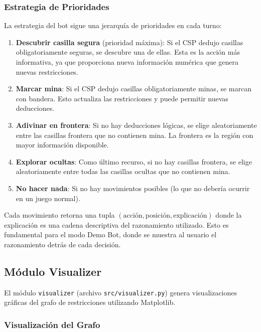 \documentclass[12pt,a4paper]{article}
\begin{document}
\subsubsection{Estrategia de Prioridades}

La estrategia del bot sigue una jerarquía de prioridades en cada turno:

\begin{enumerate}[itemsep=2pt]
    \item \textbf{Descubrir casilla segura} (prioridad máxima): Si el CSP dedujo casillas obligatoriamente seguras, se descubre una de ellas. Esta es la acción más informativa, ya que proporciona nueva información numérica que genera nuevas restricciones.

    \item \textbf{Marcar mina}: Si el CSP dedujo casillas obligatoriamente minas, se marcan con bandera. Esto actualiza las restricciones y puede permitir nuevas deducciones.

    \item \textbf{Adivinar en frontera}: Si no hay deducciones lógicas, se elige aleatoriamente entre las casillas frontera que no contienen mina. La frontera es la región con mayor información disponible.

    \item \textbf{Explorar ocultas}: Como último recurso, si no hay casillas frontera, se elige aleatoriamente entre todas las casillas ocultas que no contienen mina.

    \item \textbf{No hacer nada}: Si no hay movimientos posibles (lo que no debería ocurrir en un juego normal).
\end{enumerate}

Cada movimiento retorna una tupla $(\text{acción}, \text{posición}, \text{explicación})$ donde la explicación es una cadena descriptiva del razonamiento utilizado. Esto es fundamental para el modo Demo Bot, donde se muestra al usuario el razonamiento detrás de cada decisión.

\subsection{Módulo Visualizer}

El módulo \texttt{visualizer} (archivo \texttt{src/visualizer.py}) genera visualizaciones gráficas del grafo de restricciones utilizando Matplotlib.

\subsubsection{Visualización del Grafo}
\end{document}
